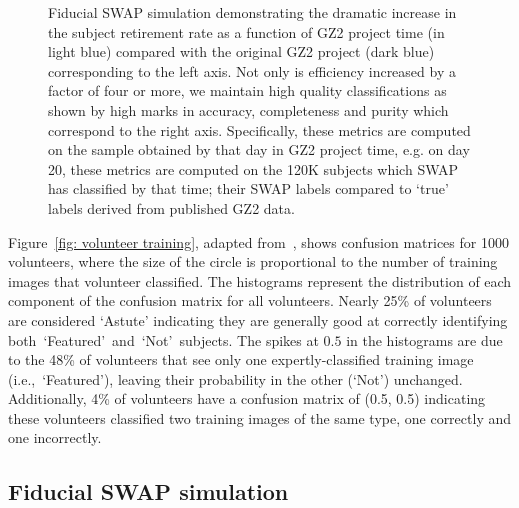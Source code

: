 \documentclass[twocolumn]{aastex6}
\newcommand{\feat}{`Featured'}
\newcommand{\notfeat}{`Not'}
\begin{document}
\begin{figure}[ht!]
\caption{Fiducial SWAP simulation demonstrating the dramatic increase in the subject retirement rate as a function of GZ2 project time (in light blue) compared with the original GZ2 project (dark blue) corresponding to the left axis. Not only is efficiency increased by a factor of four or more, we maintain high quality classifications as shown by high marks in accuracy, completeness and purity which correspond to the right axis.  Specifically, these metrics are computed on the sample obtained by that day in GZ2 project time, e.g. on day 20, these metrics are computed on the 120K subjects which SWAP has classified by that time; their SWAP labels compared to `true' labels derived from published GZ2 data. \label{fig: fiducial run}}
\end{figure}

Figure~\ref{fig: volunteer training},
adapted from~\cite{Marshall2016}, shows confusion matrices for 1000 volunteers,
where the size of the circle is proportional to the number of training images that
volunteer classified. The histograms represent the distribution of each component
of the confusion matrix for all volunteers.
 Nearly 25\% of volunteers are considered `Astute'  indicating
they are generally good at correctly identifying both~\feat~and~\notfeat~subjects.
The spikes at $0.5$ in the histograms are due to the 48\% of volunteers that see only one 
expertly-classified training image (i.e.,~\feat), leaving their probability in the 
other (\notfeat) unchanged.
Additionally, 4\% of volunteers have a confusion matrix of (0.5, 0.5) indicating these 
volunteers classified two training images of the same type, one correctly and 
one incorrectly. 


\subsection{Fiducial SWAP simulation}\label{sec: fiducial}
\end{document}
